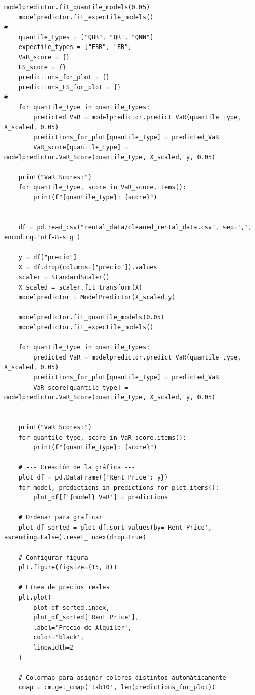 \documentclass[11pt]{book}
\theoremstyle{plain} %
\theoremstyle{definition} %
\begin{document}
\begin{lstlisting}[style=pythonstyle, caption=main.py]
    modelpredictor.fit_quantile_models(0.05)
    modelpredictor.fit_expectile_models()
#
    quantile_types = ["QBR", "QR", "QNN"]
    expectile_types = ["EBR", "ER"]
    VaR_score = {}
    ES_score = {}
    predictions_for_plot = {}
    predictions_ES_for_plot = {}
#
    for quantile_type in quantile_types:
        predicted_VaR = modelpredictor.predict_VaR(quantile_type, X_scaled, 0.05)
        predictions_for_plot[quantile_type] = predicted_VaR
        VaR_score[quantile_type] = modelpredictor.VaR_Score(quantile_type, X_scaled, y, 0.05)

    print("VaR Scores:")
    for quantile_type, score in VaR_score.items():
        print(f"{quantile_type}: {score}")
   

    df = pd.read_csv("rental_data/cleaned_rental_data.csv", sep=',', encoding='utf-8-sig')
    
    y = df["precio"]
    X = df.drop(columns=["precio"]).values
    scaler = StandardScaler()
    X_scaled = scaler.fit_transform(X)
    modelpredictor = ModelPredictor(X_scaled,y)

    modelpredictor.fit_quantile_models(0.05)
    modelpredictor.fit_expectile_models()

    for quantile_type in quantile_types:
        predicted_VaR = modelpredictor.predict_VaR(quantile_type, X_scaled, 0.05)
        predictions_for_plot[quantile_type] = predicted_VaR
        VaR_score[quantile_type] = modelpredictor.VaR_Score(quantile_type, X_scaled, y, 0.05)


    print("VaR Scores:")
    for quantile_type, score in VaR_score.items():
        print(f"{quantile_type}: {score}")

    # --- Creación de la gráfica ---
    plot_df = pd.DataFrame({'Rent Price': y})
    for model, predictions in predictions_for_plot.items():
        plot_df[f'{model} VaR'] = predictions

    # Ordenar para graficar
    plot_df_sorted = plot_df.sort_values(by='Rent Price', ascending=False).reset_index(drop=True)

    # Configurar figura
    plt.figure(figsize=(15, 8))

    # Línea de precios reales
    plt.plot(
        plot_df_sorted.index,
        plot_df_sorted['Rent Price'],
        label='Precio de Alquiler',
        color='black',
        linewidth=2
    )

    # Colormap para asignar colores distintos automáticamente
    cmap = cm.get_cmap('tab10', len(predictions_for_plot))


\end{lstlisting}
\end{document}
